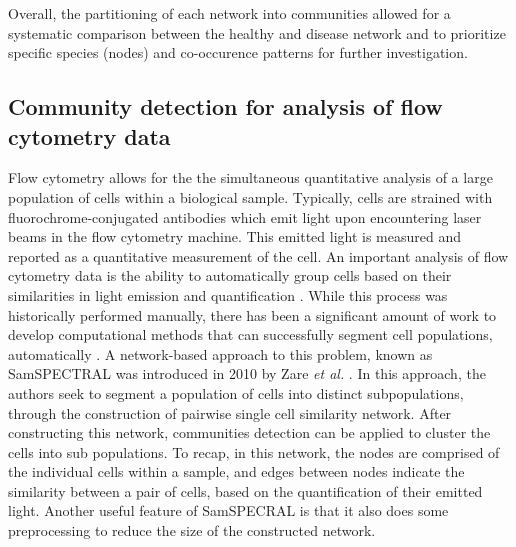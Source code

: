 \indent Overall, the partitioning of each network into communities allowed for a systematic comparison between the healthy and disease network and to prioritize specific species (nodes) and co-occurence patterns for further investigation. 

\subsection{Community detection for analysis of flow cytometry data}
\indent Flow cytometry allows for the the simultaneous quantitative analysis of a large population of cells within a biological sample. Typically, cells are strained with fluorochrome-conjugated antibodies which emit light upon encountering laser beams in the flow cytometry machine. This emitted light is measured and reported as a quantitative measurement of the cell. An important analysis of flow cytometry data is the ability to automatically group cells based on their similarities in light emission and quantification \cite{flow}. While this process was historically performed manually, there has been a significant amount of work to develop computational methods that can successfully segment cell populations, automatically \cite{nimaFlow}. A network-based approach to this problem, known as SamSPECTRAL was introduced in 2010 by Zare \emph{et al.} \cite{FlowSpectral}. In this approach, the authors seek to segment a population of cells into distinct subpopulations, through the construction of pairwise single cell similarity network. After constructing this network, communities detection can be applied to cluster the cells into sub populations. To recap, in this network, the nodes are comprised of the individual cells within a sample, and edges between nodes indicate the similarity between a pair of cells, based on the quantification of their emitted light. Another useful feature of SamSPECRAL is that it also does some preprocessing to reduce the size of the constructed network.

